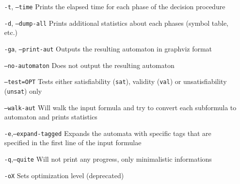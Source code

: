 \begin{itemize}
	\item[\texttt{-t}, \texttt{--time}] Prints the elapsed time for each
		phase of the decision procedure
	\item[\texttt{-d}, \texttt{--dump-all}] Prints additional statistics
		about each phases (symbol table, etc.)
	\item[\texttt{-ga}, \texttt{--print-aut}] Outputs the resulting 
		automaton in graphviz format
	\item[\texttt{--no-automaton}] Does not output the resulting
		automaton
	\item[\texttt{--test=OPT}] Tests either satisfiability (\texttt{sat}),
		validity (\texttt{val}) or unsatisfiability (\texttt{unsat}) only
	\item[\texttt{--walk-aut}] Will walk the input formula and try to
		convert each subformula to automaton and prints statistics
	\item[\texttt{-e},\texttt{--expand-tagged}] Expands the automata
		with specific tags that are specified in the first line of
		the input formulae
	\item[\texttt{-q},\texttt{--quite}] Will not print any progress,
		only minimalistic informations
	\item[\texttt{-oX}] Sets optimization level (deprecated)
\end{itemize}